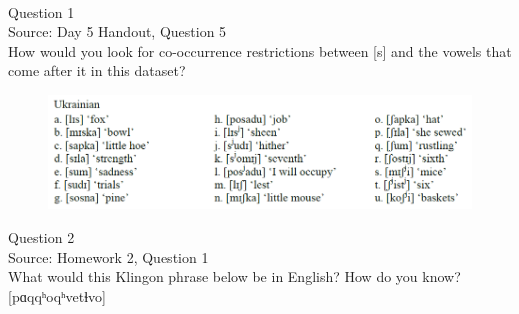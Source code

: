 \documentclass[12pt]{article}
\begin{document}
\newpage

\begin{center}
\textbf{{\color{red}{\HUGE END OF EXAM}}}\\

\end{center}
\newpage

\begin{center}
\textbf{{\color{blue}{\HUGE START OF EXAM\\}}}

\textbf{{\color{blue}{\HUGE Student ID: 3347\\}}}

\textbf{{\color{blue}{\HUGE 5:00 - 5:15 PM\\}}}

\end{center}
\newpage

{\large Question 1}\\

Source: Day 5 Handout, Question 5\\

How would you look for co-occurrence restrictions between [s] and the vowels that come after it in this dataset?\\

\begin{figure}[H]
\includegraphics{../images/ukrainian.png}
\end{figure}

\newpage

{\large Question 2}\\

Source: Homework 2, Question 1\\

What would this Klingon phrase below be in English? How do you know?\\

{[pɑqqʰoqʰvetɬvo]}
\end{document}
